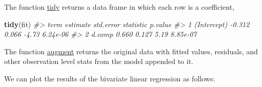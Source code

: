 \documentclass[]{book}
\newenvironment{Shaded}{\begin{snugshade}}{\end{snugshade}}
\newcommand{\KeywordTok}[1]{\textcolor[rgb]{0.13,0.29,0.53}{\textbf{#1}}}
\newcommand{\StringTok}[1]{\textcolor[rgb]{0.31,0.60,0.02}{#1}}
\newcommand{\CommentTok}[1]{\textcolor[rgb]{0.56,0.35,0.01}{\textit{#1}}}
\newcommand{\OperatorTok}[1]{\textcolor[rgb]{0.81,0.36,0.00}{\textbf{#1}}}
\newcommand{\NormalTok}[1]{#1}
\theoremstyle{definition}
\theoremstyle{definition}
\theoremstyle{definition}
\theoremstyle{remark}
\begin{document}
The function
\href{https://www.rdocumentation.org/packages/broom/topics/tidy.lm}{tidy}
returns a data frame in which each row is a coefficient,

\begin{Shaded}
\begin{Highlighting}[]
\KeywordTok{tidy}\NormalTok{(fit)}
\CommentTok{#>          term estimate std.error statistic  p.value}
\CommentTok{#> 1 (Intercept)   -0.312     0.066     -4.73 6.24e-06}
\CommentTok{#> 2      d.comp    0.660     0.127      5.19 8.85e-07}
\end{Highlighting}
\end{Shaded}

The function
\href{https://www.rdocumentation.org/packages/broom/topics/augment.lm}{augment}
returns the original data with fitted values, residuals, and other
observation level stats from the model appended to it.

\begin{Shaded}
\end{Shaded}

We can plot the results of the bivariate linear regression as follows:
\end{document}
